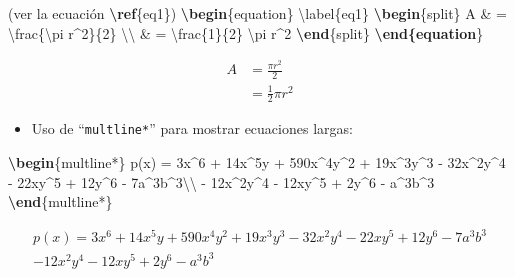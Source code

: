\documentclass[12pt,a4paper,]{book}
\newenvironment{Shaded}{\begin{snugshade}}{\end{snugshade}}
\newcommand{\ErrorTok}[1]{\textcolor[rgb]{0.64,0.00,0.00}{\textbf{#1}}}
\newcommand{\ExtensionTok}[1]{#1}
\newcommand{\KeywordTok}[1]{\textcolor[rgb]{0.13,0.29,0.53}{\textbf{#1}}}
\newcommand{\NormalTok}[1]{#1}
\newcommand{\SpecialCharTok}[1]{\textcolor[rgb]{0.00,0.00,0.00}{#1}}
\newcommand{\SpecialStringTok}[1]{\textcolor[rgb]{0.31,0.60,0.02}{#1}}
\providecommand{\tightlist}{%
  \setlength{\itemsep}{0pt}\setlength{\parskip}{0pt}}
\numberwithin{dummy}{section}
\theoremstyle{ocrenumbox}
\theoremstyle{blacknumex}
\theoremstyle{blacknumbox}
\theoremstyle{ocrenum}
\theoremstyle{ocrenum}
\begin{document}
\begin{Shaded}
\begin{Highlighting}[]
\NormalTok{(ver la ecuación }\KeywordTok{\textbackslash{}ref}\NormalTok{\{}\ExtensionTok{eq1}\NormalTok{\})}
\KeywordTok{\textbackslash{}begin}\NormalTok{\{}\ExtensionTok{equation}\NormalTok{\}}\SpecialStringTok{ }\SpecialCharTok{\textbackslash{}label}\SpecialStringTok{\{eq1\}}
\KeywordTok{\textbackslash{}begin}\NormalTok{\{}\ExtensionTok{split}\NormalTok{\}}
\SpecialStringTok{A \& = }\SpecialCharTok{\textbackslash{}frac}\SpecialStringTok{\{}\SpecialCharTok{\textbackslash{}pi}\SpecialStringTok{ r\^{}2\}\{2\} }\SpecialCharTok{\textbackslash{}\textbackslash{}}
\SpecialStringTok{ \& = }\SpecialCharTok{\textbackslash{}frac}\SpecialStringTok{\{1\}\{2\} }\SpecialCharTok{\textbackslash{}pi}\SpecialStringTok{ r\^{}2}
\KeywordTok{\textbackslash{}end}\NormalTok{\{}\ExtensionTok{split}\NormalTok{\}}
\ErrorTok{\textbackslash{}end\{equation}\NormalTok{\}}
\end{Highlighting}
\end{Shaded}

\begin{equation} \label{eq1}
\begin{split}
A & = \frac{\pi r^2}{2} \\
 & = \frac{1}{2} \pi r^2
\end{split}
\end{equation}

\begin{itemize}
\tightlist
\item
  Uso de ``\texttt{multline*}'' para mostrar ecuaciones largas:
\end{itemize}

\begin{Shaded}
\begin{Highlighting}[]
\KeywordTok{\textbackslash{}begin}\NormalTok{\{}\ExtensionTok{multline*}\NormalTok{\}}
\SpecialStringTok{p(x) = 3x\^{}6 + 14x\^{}5y + 590x\^{}4y\^{}2 + 19x\^{}3y\^{}3 }
\SpecialStringTok{            {-} 32x\^{}2y\^{}4 {-} 22xy\^{}5 + 12y\^{}6 {-} 7a\^{}3b\^{}3}\SpecialCharTok{\textbackslash{}\textbackslash{}}\SpecialStringTok{ }
\SpecialStringTok{{-} 12x\^{}2y\^{}4 {-} 12xy\^{}5 + 2y\^{}6 {-} a\^{}3b\^{}3}
\KeywordTok{\textbackslash{}end}\NormalTok{\{}\ExtensionTok{multline*}\NormalTok{\}}
\end{Highlighting}
\end{Shaded}

\begin{multline*}
p(x) = 3x^6 + 14x^5y + 590x^4y^2 + 19x^3y^3 
            - 32x^2y^4 - 22xy^5 + 12y^6 - 7a^3b^3 \\ 
- 12x^2y^4 - 12xy^5 + 2y^6 - a^3b^3
\end{multline*}
\end{document}
